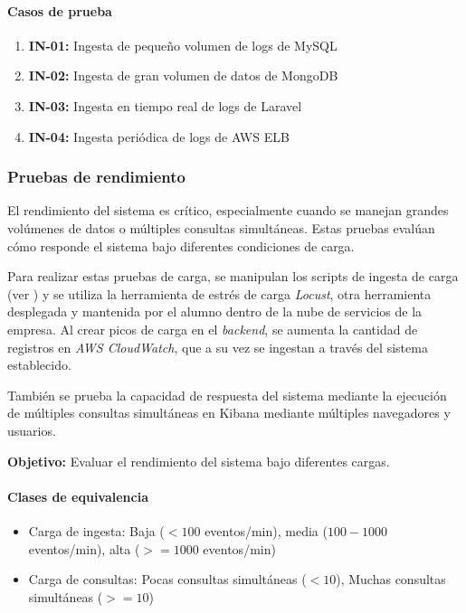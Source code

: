 \paragraph{Casos de prueba}
\begin{enumerate}
    \item \textbf{IN-01:} Ingesta de pequeño volumen de logs de MySQL
    \item \textbf{IN-02:} Ingesta de gran volumen de datos de MongoDB
    \item \textbf{IN-03:} Ingesta en tiempo real de logs de Laravel
    \item \textbf{IN-04:} Ingesta periódica de logs de AWS ELB
\end{enumerate}


\newpage{}
\subsubsection{Pruebas de rendimiento}
El rendimiento del sistema es crítico, especialmente cuando se manejan grandes
volúmenes de datos o múltiples consultas simultáneas. Estas pruebas evalúan
cómo responde el sistema bajo diferentes condiciones de carga.

Para realizar estas pruebas de carga, se manipulan los scripts de ingesta de
carga (ver ) y se utiliza la herramienta de estrés de
carga \textit{Locust}, otra herramienta desplegada y mantenida por el alumno
dentro de la nube de servicios de la empresa. Al crear picos de carga en el
\textit{backend}, se aumenta la cantidad de registros en \textit{AWS CloudWatch},
que a su vez se ingestan a través del sistema establecido.

También se prueba la capacidad de respuesta del sistema mediante la ejecución
de múltiples consultas simultáneas en Kibana mediante múltiples navegadores y
usuarios.

\textbf{Objetivo:} Evaluar el rendimiento del sistema bajo diferentes cargas.

\paragraph{Clases de equivalencia}

\begin{itemize}
    \item Carga de ingesta: Baja ($<100$ eventos/min), media ($100-1000$ eventos/min),
    	alta ($>=1000$ eventos/min)
    \item Carga de consultas: Pocas consultas simultáneas ($<10$), Muchas
    consultas simultáneas ($>=10$)
\end{itemize}

